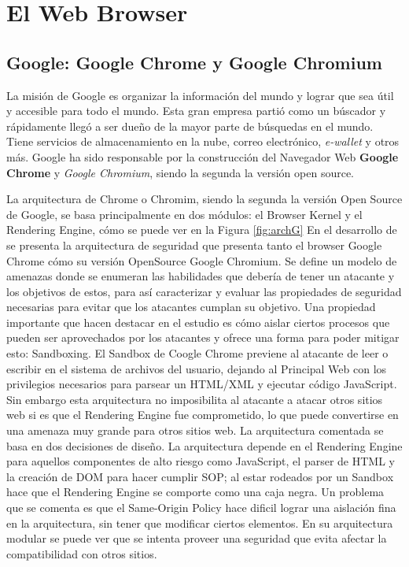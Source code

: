 \chapter{El Web Browser} %
\label{chap:chap3}



\section{Google: Google Chrome y Google Chromium}
La misión de Google es organizar la información del mundo y lograr que sea útil y accesible para todo el mundo. Esta gran empresa partió como un búscador y rápidamente llegó a ser dueño de la mayor parte de búsquedas en el mundo. Tiene servicios de almacenamiento en la nube, correo electrónico, \textit{e-wallet} y otros más. Google ha sido responsable por la construcción del Navegador Web \textbf{Google Chrome} y \textit{Google Chromium}, siendo la segunda la versión open source.

La arquitectura de Chrome o Chromim, siendo la segunda la versión Open Source de Google, se basa principalmente en
dos módulos: el Browser Kernel y el Rendering Engine, cómo se puede ver en la Figura \ref{fig:archG} En el desarrollo de \cite{barth2008security} se presenta la arquitectura de seguridad que presenta tanto el browser Google Chrome cómo su versión OpenSource Google Chromium. Se define un modelo de amenazas donde se enumeran las habilidades que debería de tener un atacante y los objetivos de estos, para así caracterizar y evaluar las propiedades de seguridad necesarias para evitar que los atacantes cumplan su objetivo. Una propiedad importante que hacen destacar en el estudio es cómo aislar ciertos procesos que pueden ser aprovechados por los atacantes y ofrece una forma para poder mitigar esto: Sandboxing. El Sandbox de Coogle Chrome previene al atacante de leer o escribir en el sistema de archivos del usuario, dejando al Principal Web con los privilegios necesarios para parsear un HTML/XML y ejecutar código JavaScript. Sin embargo esta arquitectura no imposibilita al atacante a atacar otros sitios web si es
que el Rendering Engine fue comprometido, lo que puede convertirse en una amenaza muy grande para otros sitios web. La arquitectura comentada se basa en dos decisiones de diseño. La arquitectura depende en el Rendering Engine para aquellos componentes de alto riesgo como JavaScript, el parser de HTML y la creación de DOM para hacer cumplir SOP; al estar rodeados por un Sandbox hace que el Rendering Engine se comporte como una caja negra. Un problema que se comenta es que el Same-Origin Policy hace dificil lograr una aislación fina en la arquitectura, sin tener que modificar ciertos elementos. En su arquitectura modular se puede ver que se intenta proveer una seguridad que evita afectar la compatibilidad con otros sitios.

